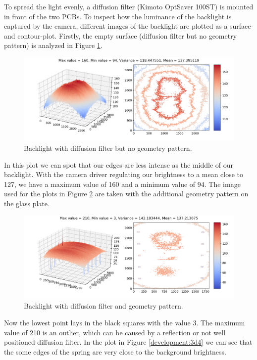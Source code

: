 To spread the light evenly, a diffusion filter (Kimoto OptSaver 100ST) is mounted in front of the two PCBs.
To inspect how the luminance of the backlight is captured by the camera, different images of the backlight are plotted as a surface- and contour-plot.
Firstly, the empty surface (diffusion filter but no geometry pattern) is analyzed in Figure \ref{development:3d0}. 
\begin{figure}[ht]
	\centering
	\includegraphics[trim=50 0 0 0,clip,width=0.9\linewidth]{3-development/backlight/3d0.png}
	\caption{Backlight with diffusion filter but no geometry pattern.\label{development:3d0}}
\end{figure} 
In this plot we can spot that our edges are less intense as the middle of our backlight.
With the camera driver regulating our brightness to a mean close to 127, we have a maximum value of 160 and a minimum value of 94.
The image used for the plots in Figure \ref{development:3d1} are taken with the additional geometry pattern on the glass plate.
\begin{figure}[ht]
	\centering
	\includegraphics[trim=50 0 0 0,clip,width=0.9\linewidth]{3-development/backlight/3d1.png}
	\caption{Backlight with diffusion filter and geometry pattern.\label{development:3d1}}
\end{figure} 
Now the lowest point lays in the black squares with the value 3.
The maximum value of 210 is an outlier, which can be caused by a reflection or not well positioned diffusion filter.
In the plot in Figure \ref{development:3d4} we can see that the some edges of the spring are very close to the background brightness.
